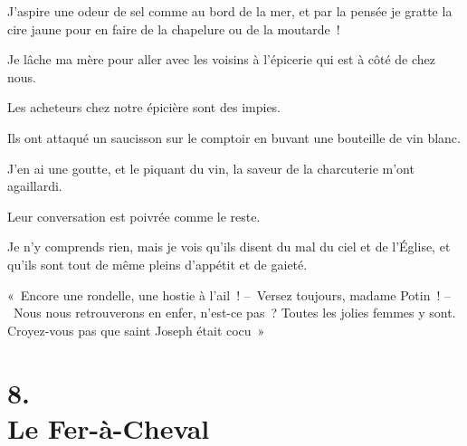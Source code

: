 \documentclass[french,twoside]{book} %
\begin{document}
J’aspire une odeur de sel comme au bord de la mer, et par la pensée je gratte la cire jaune pour en faire de la chapelure ou de la moutarde !\par
Je lâche ma mère pour aller avec les voisins à l’épicerie qui est à côté de chez nous.\par
Les acheteurs chez notre épicière sont des impies.\par
Ils ont attaqué un saucisson sur le comptoir en buvant une bouteille de vin blanc.\par
J’en ai une goutte, et le piquant du vin, la saveur de la charcuterie m’ont agaillardi.\par
Leur conversation est poivrée comme le reste.\par
Je n’y comprends rien, mais je vois qu’ils disent du mal du ciel et de l’Église, et qu’ils sont tout de même pleins d’appétit et de gaieté.\par
« Encore une rondelle, une hostie à l’ail ! – Versez toujours, madame Potin ! – Nous nous retrouverons en enfer, n’est-ce pas ? Toutes les jolies femmes y sont. Croyez-vous pas que saint Joseph était cocu »
\section[{8. Le Fer-à-Cheval}]{8. \\
Le Fer-à-Cheval}\renewcommand{\leftmark}{8. \\
Le Fer-à-Cheval}
\end{document}
